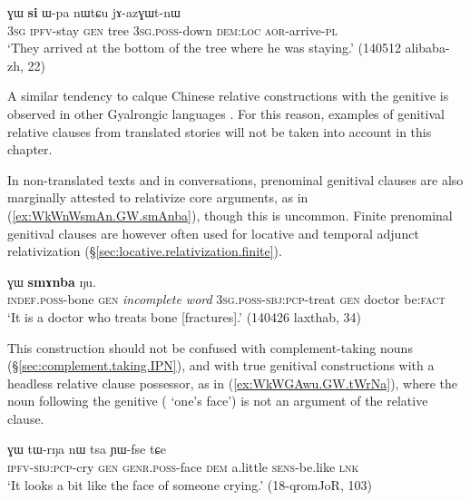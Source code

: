 \begin{exe}
\ex \label{ex:kurAZi.GW.relative}
  ɣɯ \textbf{si} ɯ-pa nɯtɕu jɤ-azɣɯt-nɯ \\
 \textsc{3sg} \textsc{ipfv}-stay \textsc{gen} tree \textsc{3sg}.\textsc{poss}-down \textsc{dem}:\textsc{loc} \textsc{aor}-arrive-\textsc{pl} \\
\glt `They arrived at the bottom of the tree where he was staying.' (140512 alibaba-zh, 22)
\end{exe}
 
A similar tendency to calque Chinese relative constructions with the genitive is observed in other Gyalrongic languages \citep{lai18genitivization}.  For this reason, examples of genitival relative clauses from translated stories will not be taken into account in this chapter. 

In non-translated texts and in conversations, prenominal genitival clauses are also marginally attested to relativize core arguments, as in (\ref{ex:WkWnWsmAn.GW.smAnba}), though this is uncommon. Finite prenominal genitival clauses are however often used for locative and temporal adjunct relativization (§\ref{sec:locative.relativization.finite}).

\begin{exe}
\ex \label{ex:WkWnWsmAn.GW.smAnba}
  ɣɯ \textbf{smɤnba} ŋu. \\
 \textsc{indef}.\textsc{poss}-bone \textsc{gen} \textit{incomplete word} \textsc{3sg}.\textsc{poss}-\textsc{sbj}:\textsc{pcp}-treat \textsc{gen} doctor be:\textsc{fact} \\
 \glt `It is a doctor who treats bone [fractures].'  (140426 laxthab, 34)
 \end{exe}
  
 This construction should not be confused with complement-taking nouns (§\ref{sec:complement.taking.IPN}), and with true genitival constructions with a headless relative clause possessor, as in (\ref{ex:WkWGAwu.GW.tWrNa}), where the noun following the genitive ( `one's face') is not an argument of the relative clause.
 
\begin{exe}
\ex \label{ex:WkWGAwu.GW.tWrNa}
\gll [ɲɯ-kɯ-ɣɤwu] ɣɯ tɯ-rŋa nɯ tsa ɲɯ-fse tɕe \\
 \textsc{ipfv}-\textsc{sbj}:\textsc{pcp}-cry \textsc{gen} \textsc{genr}.\textsc{poss}-face \textsc{dem} a.little \textsc{sens}-be.like \textsc{lnk} \\
 \glt `It looks a bit like the face of someone crying.' (18-qromJoR, 103)
\end{exe}
  

